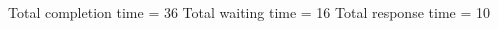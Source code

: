 \begin{RTGrid}[width=0.8\textwidth]{5}{20}
\end{RTGrid}\newline\newline
Total completion time = 36\newline
Total waiting time = 16\newline
Total response time = 10\newline
